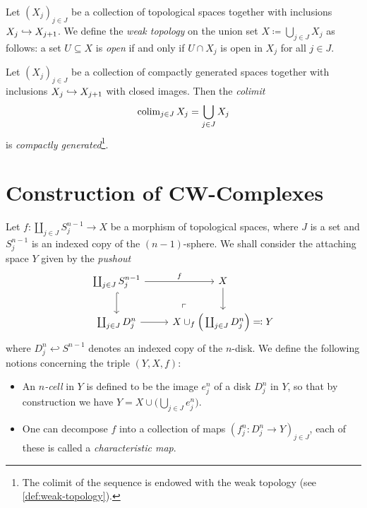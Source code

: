 \begin{definition}
    \label{def:weak-topology}
    Let \((X_j)_{j \in J}\) be a collection of topological spaces together with
    inclusions \(X_j \hookrightarrow X_{j+1}\). We define the \emph{weak topology} on the union
    set \(X \coloneq \bigcup_{j \in J} X_j\) as follows: a set \(U \subseteq X\) is
    \emph{open} if and only if \(U \cap X_j\) is open in \(X_j\) for all
    \(j \in J\).
\end{definition}

\begin{proposition}[Colimits]
    \label{prop:compactly-generated-passage-colimit}
    Let \((X_j)_{j \in J}\) be a collection of compactly generated spaces together
    with inclusions \(X_j \hookrightarrow X_{j+1}\) with closed images. Then the \emph{colimit}
    \[
        \operatorname{colim}_{j \in J} X_j = \bigcup_{j \in J} X_j
    \]
    is \emph{compactly generated}\footnote{
        The colimit of the sequence is endowed with the weak topology (see
        \cref{def:weak-topology}).
    }.
\end{proposition}

\section{Construction of CW-Complexes}

\begin{definition}
    \label{def:attaching-cells}
    Let \(f: \coprod_{j \in J} S_j^{n-1} \to X\) be a morphism of topological
    spaces, where \(J\) is a set and \(S_j^{n-1}\) is an indexed copy of the
    \((n-1)\)-sphere. We shall consider the attaching space \(Y\) given by the
    \emph{pushout}
    \[
        \begin{tikzcd}
            \coprod_{j \in J} S_j^{n-1} \ar[r, "f"] \ar[d, hook]
            \ar[rd, phantom, "\ulcorner", very near end]
            &X \ar[d]
            \\
            \coprod_{j \in J} D_j^n \ar[r]
            &X \cup_f \Big( \coprod_{j \in J} D_j^n \Big) \eqqcolon Y
        \end{tikzcd}
    \]
    where \(D_j^n \hookleftarrow S^{n-1}\) denotes an indexed copy of the
    \(n\)-disk. We define the following notions concerning the triple \((Y, X, f)\):
    \begin{itemize}\setlength\itemsep{0em}
        \item An \emph{\(n\)-cell} in \(Y\) is defined to be the image \(e_j^n\) of a
              disk \(D_j^n\) in \(Y\), so that by construction we have
              \(Y = X \cup \big( \bigcup_{j \in J} e_j^n \big)\).

        \item One can decompose \(f\) into a collection of maps
              \((f_j^n: D_j^n \to Y)_{j \in J}\), each of these is called a
              \emph{characteristic map}.
    \end{itemize}
\end{definition}

